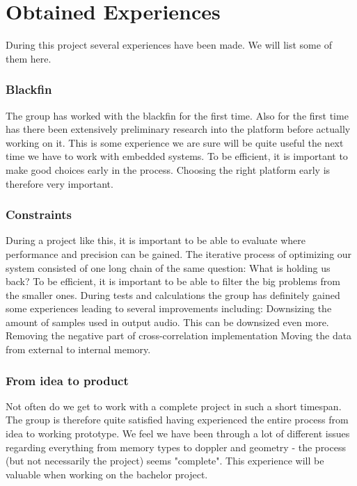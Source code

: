 \chapter{Obtained Experiences}
During this project several experiences have been made. We will list some of them here.

\subsection{Blackfin}
The group has worked with the blackfin for the first time. Also for the first time has there been extensively preliminary research into the platform before actually working on it. This is some experience we are sure will be quite useful the next time we have to work with embedded systems. To be efficient, it is important to make good choices early in the process. Choosing the right platform early is therefore very important.

\subsection{Constraints}
During a project like this, it is important to be able to evaluate where performance and precision can be gained. The iterative process of optimizing our system consisted of one long chain of the same question: What is holding us back? To be efficient, it is important to be able to filter the big problems from the smaller ones. During tests and calculations the group has definitely gained some experiences leading to several improvements including:
Downsizing the amount of samples used in output audio. This can be downsized even more.
Removing the negative part of cross-correlation implementation
Moving the data from external to internal memory.

\subsection{From idea to product}
Not often do we get to work with a complete project in such a short timespan. The group is therefore quite satisfied having experienced the entire process from idea to working prototype. We feel we have been through a lot of different issues regarding everything from memory types to doppler and geometry - the process (but not necessarily the project) seems "complete". This experience will be valuable when working on the bachelor project.